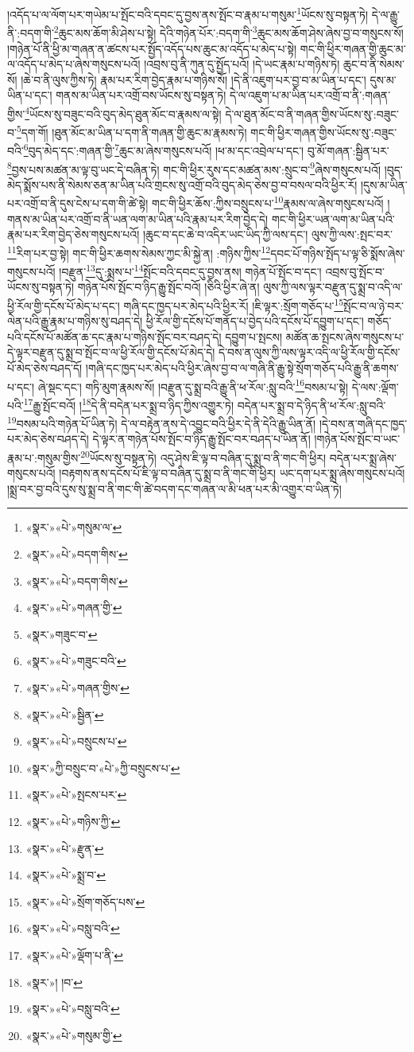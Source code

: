 །འདོད་པ་ལ་ལོག་པར་གཡེམ་པ་སྤོང་བའི་དབང་དུ་བྱས་ནས་སྤོང་བ་རྣམ་པ་གསུམ་\footnote{«སྣར་»«པེ་»གསུམ་ལ་}ཡོངས་སུ་བསྟན་ཏེ། དེ་ལ་རྒྱུ་ནི་:བདག་གི་\footnote{«སྣར་»«པེ་»བདག་གིས་}ཆུང་མས་ཆོག་མི་ཤེས་པ་སྟེ། དེའི་གཉེན་པོར་:བདག་གི་\footnote{«སྣར་»«པེ་»བདག་གིས་}ཆུང་མས་ཆོག་ཤེས་ཞེས་བྱ་བ་གསུངས་སོ། །གཉེན་པོ་ནི་ཕྱི་མ་གཞན་ན་ཚངས་པར་སྤྱོད་འདོད་པས་ཆུང་མ་འདོད་པ་མེད་པ་སྟེ། གང་གི་ཕྱིར་གཞན་གྱི་ཆུང་མ་ལ་འདོད་པ་མེད་པ་ཞེས་གསུངས་པའོ། །འབྲས་བུ་ནི་ཀུན་དུ་སྤྱོད་པའོ། །དེ་ཡང་རྣམ་པ་གཉིས་ཏེ། ཆུང་བ་ནི་སེམས་སོ། །ཆེ་བ་ནི་ལུས་ཀྱིས་ཏེ། རྣམ་པར་རིག་བྱེད་རྣམ་པ་གཉིས་སོ། །དེ་ནི་འཇུག་པར་བྱ་བ་མ་ཡིན་པ་དང་། དུས་མ་ཡིན་པ་དང་། གནས་མ་ཡིན་པར་འགྲོ་བས་ཡོངས་སུ་བསྟན་ཏེ། དེ་ལ་འཇུག་པ་མ་ཡིན་པར་འགྲོ་བ་ནི་:གཞན་གྱིས་\footnote{«སྣར་»«པེ་»གཞན་གྱི་}ཡོངས་སུ་བཟུང་བའི་བུད་མེད་ཐུན་མོང་བ་རྣམས་ལ་སྟེ། དེ་ལ་ཐུན་མོང་བ་ནི་གཞན་གྱིས་ཡོངས་སུ་:བཟུང་བ་\footnote{«སྣར་»གཟུང་བ་}དག་གོ། །ཐུན་མོང་མ་ཡིན་པ་དག་ནི་གཞན་གྱི་ཆུང་མ་རྣམས་ཏེ། གང་གི་ཕྱིར་གཞན་གྱིས་ཡོངས་སུ་:བཟུང་བའི་\footnote{«སྣར་»«པེ་»གཟུང་བའི་}བུད་མེད་དང་:གཞན་གྱི་\footnote{«སྣར་»«པེ་»གཞན་གྱིས་}ཆུང་མ་ཞེས་གསུངས་པའོ། །ཕ་མ་དང་འབྲེལ་པ་དང་། བུ་མོ་གཞན་:སྦྱིན་པར་\footnote{«སྣར་»«པེ་»སྦྱིན་}བྱས་པས་མཚན་མ་ལྟ་བུ་ཡང་དེ་བཞིན་ཏེ། གང་གི་ཕྱིར་རུས་དང་མཚན་མས་:སྲུང་བ་\footnote{«སྣར་»«པེ་»བསྲུངས་པ་}ཞེས་གསུངས་པའོ། །བུད་མེད་སྨོས་པས་ནི་སེམས་ཅན་མ་ཡིན་པའི་གྲངས་སུ་འགྲོ་བའི་བུད་མེད་ཅེས་བྱ་བ་བསལ་བའི་ཕྱིར་རོ། །དུས་མ་ཡིན་པར་འགྲོ་བ་ནི་དུས་ངེས་པ་དག་གི་ཚེ་སྟེ། གང་གི་ཕྱིར་ཆོས་:ཀྱིས་བསྲུངས་པ་\footnote{«སྣར་»ཀྱི་བསྲུང་བ་«པེ་»ཀྱི་བསྲུངས་པ་}རྣམས་ལ་ཞེས་གསུངས་པའོ། །གནས་མ་ཡིན་པར་འགྲོ་བ་ནི་ཡན་ལག་མ་ཡིན་པའི་རྣམ་པར་རིག་བྱེད་དེ། གང་གི་ཕྱིར་ཡན་ལག་མ་ཡིན་པའི་རྣམ་པར་རིག་བྱེད་ཅེས་གསུངས་པའོ། །ཆུང་བ་དང་ཆེ་བ་འདིར་ཡང་ཡིད་ཀྱི་ལས་དང་། ལུས་ཀྱི་ལས་:སྤང་བར་\footnote{«སྣར་»«པེ་»སྤངས་པར་}རིག་པར་བྱ་སྟེ། གང་གི་ཕྱིར་ཆགས་སེམས་ཀྱང་མི་སྐྱེ་ན། :གཉིས་ཀྱིས་\footnote{«སྣར་»«པེ་»གཉིས་ཀྱི་}དབང་པོ་གཉིས་སྤོད་པ་ལྟ་ཅི་སྨོས་ཞེས་གསུངས་པའོ། །བརྫུན་\footnote{«སྣར་»«པེ་»རྫུན་}དུ་:སྨྲས་པ་\footnote{«སྣར་»«པེ་»སྨྲ་བ་}སྤོང་བའི་དབང་དུ་བྱས་ནས། གཉེན་པོ་སྤོང་བ་དང་། འབྲས་བུ་སྤོང་བ་ཡོངས་སུ་བསྟན་ཏེ། གཉེན་པོས་སྤོང་བ་ཉིད་རྒྱུ་སྤོང་བའོ། །ཅིའི་ཕྱིར་ཞེ་ན། ལུས་ཀྱི་ལས་ལྟར་བརྫུན་དུ་སྨྲ་བ་འདི་ལ་ཕྱི་རོལ་གྱི་དངོས་པོ་མེད་པ་དང་། གཞི་དང་ཁྱད་པར་མེད་པའི་ཕྱིར་རོ། །ཇི་ལྟར་:སྲོག་གཅོད་པ་\footnote{«སྣར་»«པེ་»སྲོག་གཅོད་པས་}སྤོང་བ་ལ་ཉེ་བར་ལེན་པའི་རྒྱུ་རྣམ་པ་གཉིས་སུ་བཤད་དེ། ཕྱི་རོལ་གྱི་དངོས་པོ་གནོད་པ་བྱེད་པའི་དངོས་པོ་དབྱུག་པ་དང་། གཅོད་པའི་དངོས་པོ་མཚོན་ཆ་དང་རྣམ་པ་གཉིས་སྤོང་བར་བཤད་དེ། དབྱུག་པ་སྤངས། མཚོན་ཆ་སྤངས་ཞེས་གསུངས་པ་དེ་ལྟར་བརྫུན་དུ་སྨྲ་བ་སྤོང་བ་ལ་ཕྱི་རོལ་གྱི་དངོས་པོ་མེད་དེ། དེ་བས་ན་ལུས་ཀྱི་ལས་ལྟར་འདི་ལ་ཕྱི་རོལ་གྱི་དངོས་པོ་མེད་ཅེས་བཤད་དོ། །གཞི་དང་ཁྱད་པར་མེད་པའི་ཕྱིར་ཞེས་བྱ་བ་ལ་གཞི་ནི་རྒྱུ་སྟེ་སྲོག་གཅོད་པའི་རྒྱུ་ནི་ཆགས་པ་དང་། ཞེ་སྡང་དང་། གཏི་མུག་རྣམས་སོ། །བརྫུན་དུ་སྨྲ་བའི་རྒྱུ་ནི་ཕ་རོལ་:སླུ་བའི་\footnote{«སྣར་»«པེ་»བསླུ་བའི་}བསམ་པ་སྟེ། དེ་ལས་:ལྡོག་པའི་\footnote{«སྣར་»«པེ་»ལྡོག་པ་ནི་}རྒྱུ་སྤོང་བའོ། །\footnote{«སྣར་»། །བ་}དེ་ནི་བདེན་པར་སྨྲ་བ་ཉིད་ཀྱིས་འགྱུར་ཏེ། བདེན་པར་སྨྲ་བ་དེ་ཉིད་ནི་ཕ་རོལ་:སླུ་བའི་\footnote{«སྣར་»«པེ་»བསླུ་བའི་}བསམ་པའི་གཉེན་པོ་ཡིན་ཏེ། དེ་ལ་བརྟེན་ནས་དེ་འབྱུང་བའི་ཕྱིར་དེ་ནི་དེའི་རྒྱུ་ཡིན་ནོ། །དེ་བས་ན་གཞི་དང་ཁྱད་པར་མེད་ཅེས་བཤད་དེ། དེ་ལྟར་ན་གཉེན་པོས་སྤོང་བ་ཉིད་རྒྱུ་སྤོང་བར་བཤད་པ་ཡིན་ནོ། །གཉེན་པོས་སྤོང་བ་ཡང་རྣམ་པ་:གསུམ་གྱིས་\footnote{«སྣར་»«པེ་»གསུམ་གྱི་}ཡོངས་སུ་བསྟན་ཏེ། འདུ་ཤེས་ཇི་ལྟ་བ་བཞིན་དུ་སྨྲ་བ་ནི་གང་གི་ཕྱིར། བདེན་པར་སྨྲ་ཞེས་གསུངས་པའོ། །བརྟགས་ནས་དངོས་པོ་ཇི་ལྟ་བ་བཞིན་དུ་སྨྲ་བ་ནི་གང་གི་ཕྱིར། ཡང་དག་པར་སྨྲ་ཞེས་གསུངས་པའོ། །སྨྲ་བར་བྱ་བའི་དུས་སུ་སྨྲ་བ་ནི་གང་གི་ཚེ་བདག་དང་གཞན་ལ་མི་ཕན་པར་མི་འགྱུར་བ་ཡིན་ཏེ། 